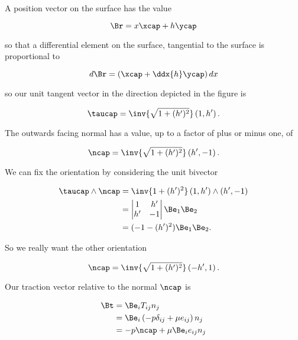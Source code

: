 A position vector on the surface has the value

\begin{equation}\label{eqn:inclinedFlowWithoutConstantHeightAssumption:100}
\Br = x \xcap + h \ycap
\end{equation}

so that a differential element on the surface, tangential to the surface is proportional to

\begin{equation}\label{eqn:inclinedFlowWithoutConstantHeightAssumption:120}
d\Br = \left( \xcap + \ddx{h} \ycap \right) dx
\end{equation}

so our unit tangent vector in the direction depicted in the figure is

\begin{equation}\label{eqn:inclinedFlowWithoutConstantHeightAssumption:140}
\taucap = \inv{\sqrt{1 + (h')^2}} \left( 1, h' \right).
\end{equation}

The outwards facing normal has a value, up to a factor of plus or minus one, of

\begin{equation}\label{eqn:inclinedFlowWithoutConstantHeightAssumption:160}
\ncap = 
\inv{\sqrt{1 + (h')^2}} \left( h', -1 \right).
\end{equation}

We can fix the orientation by considering the unit bivector

\begin{align*}
\taucap \wedge \ncap &= 
\inv{1 + (h')^2} 
\left( 1, h' \right) 
\wedge
\left( h', -1 \right) \\
&=
\begin{vmatrix}
1 & h' \\
h' & -1
\end{vmatrix}
\Be_1 \Be_2 \\
&=
( -1 - (h')^2 )
\Be_1 \Be_2.
\end{align*}

So we really want the other orientation

\begin{equation}\label{eqn:inclinedFlowWithoutConstantHeightAssumption:180}
\ncap = \inv{\sqrt{1 + (h')^2}} \left( -h', 1 \right).
\end{equation}

Our traction vector relative to the normal $\ncap$ is

\begin{align*}
\Bt 
&= \Be_i T_{ij} n_j \\
&= 
\Be_i \left( -p \delta_{ij}
+ \mu e_{ij}
\right) n_j \\
&=
-p \ncap + \mu \Be_i e_{ij} n_j
\end{align*}

